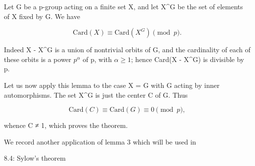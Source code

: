 Let G be a p-group acting on a finite set X, and let X^G be the set of elements of X fixed by G. We have

$$\text{Card}(X) \equiv \text{Card}(X^G) \pmod{p}.$$

Indeed X - X^G is a union of nontrivial orbits of G, and the cardinality of each of these orbits is a power $p^\alpha$ of p, with $\alpha \geqslant 1$; hence Card(X - X^G) is divisible by p.

Let us now apply this lemma to the case X = G with G acting by inner automorphisms. The set X^G is just the center C of G. Thus

$$\text{Card}(C) \equiv \text{Card}(G) \equiv 0 \pmod{p},$$

whence C ≠ {1}, which proves the theorem.

We record another application of lemma 3 which will be used in

8.4: Sylow's theorem
